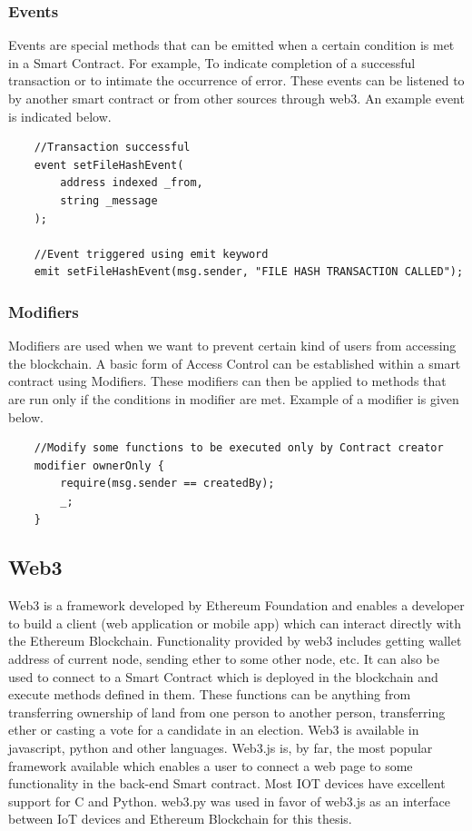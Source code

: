 \documentclass[11pt,openright]{report}
\begin{document}
\subsubsection{Events}
Events are special methods that can be emitted when a certain condition is met in a Smart Contract. For example, To indicate completion of a successful transaction or to intimate the occurrence of error. These events can be listened to by another smart contract or from other sources through web3. An example event is indicated below.
\begin{verbatim}
    //Transaction successful
    event setFileHashEvent(
        address indexed _from,
        string _message
    );
    
    //Event triggered using emit keyword
    emit setFileHashEvent(msg.sender, "FILE HASH TRANSACTION CALLED");
\end{verbatim}


\subsubsection{Modifiers}
Modifiers are used when we want to prevent certain kind of users from accessing the blockchain. A basic form of Access Control can be established within a smart contract using Modifiers. These modifiers can then be applied to methods that are run only if the conditions in modifier are met. Example of a modifier is given below.
\begin{verbatim}
    //Modify some functions to be executed only by Contract creator
    modifier ownerOnly {
        require(msg.sender == createdBy);
        _;
    }
\end{verbatim}


\subsection{Web3}
Web3 is a framework developed by Ethereum Foundation and enables a developer to build a client (web application or mobile app) which can interact directly with the Ethereum Blockchain. Functionality provided by web3 includes getting wallet address of current node, sending ether to some other node, etc. It can also be used to connect to a Smart Contract which is deployed in the blockchain and execute methods defined in them. These functions can be anything from transferring ownership of land from one person to another person, transferring ether or casting a vote for a candidate in an election. Web3 is available in javascript, python and other languages. Web3.js is, by far, the most popular framework available which enables a user to connect a web page to some functionality in the back-end Smart contract. Most IOT devices have excellent support for C and Python. web3.py was used in favor of web3.js as an interface between IoT devices and Ethereum Blockchain for this thesis.
\end{document}
